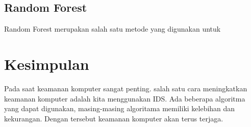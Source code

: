 \documentclass[conference]{IEEEtran}
\begin{document}
\subsection{Random Forest}
Random Forest merupakan salah satu metode yang digunakan untuk


\section{Kesimpulan}
Pada saat keamanan komputer sangat penting. salah satu cara meningkatkan keamanan komputer adalah kita menggunakan IDS. Ada beberapa algoritma yang dapat digunakan, masing-masing algoritama memiliki kelebihan dan kekurangan.
Dengan tersebut keamanan komputer akan terus terjaga.



\end{document}
